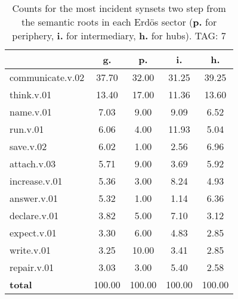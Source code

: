 \begin{table}[h!]
\begin{center}
\begin{tabular}{| l || c | c | c | c |}\hline
 & {\bf g.} & {\bf p.} & {\bf i.} & {\bf h.} \\\hline\hline
communicate.v.02 & 37.70  & 32.00  & 31.25  & 39.25 \\\hline
think.v.01 & 13.40  & 17.00  & 11.36  & 13.60 \\\hline
name.v.01 & 7.03  & 9.00  & 9.09  & 6.52 \\\hline
run.v.01 & 6.06  & 4.00  & 11.93  & 5.04 \\\hline
save.v.02 & 6.02  & 1.00  & 2.56  & 6.96 \\\hline
attach.v.03 & 5.71  & 9.00  & 3.69  & 5.92 \\\hline
increase.v.01 & 5.36  & 3.00  & 8.24  & 4.93 \\\hline
answer.v.01 & 5.32  & 1.00  & 1.14  & 6.36 \\\hline
declare.v.01 & 3.82  & 5.00  & 7.10  & 3.12 \\\hline
expect.v.01 & 3.30  & 6.00  & 4.83  & 2.85 \\\hline
write.v.01 & 3.25  & 10.00  & 3.41  & 2.85 \\\hline
repair.v.01 & 3.03  & 3.00  & 5.40  & 2.58 \\\hline\hline
{{\bf total}} & 100.00  & 100.00  & 100.00  & 100.00 \\\hline
\end{tabular}
\caption{Counts for the most incident synsets two step from the semantic roots in each Erd\"os sector ({\bf p.} for periphery, {\bf i.} for intermediary, {\bf h.} for hubs). TAG: 7}
\end{center}
\end{table}